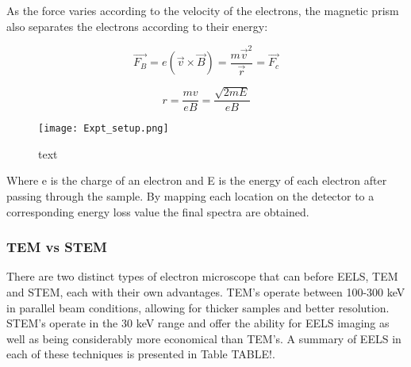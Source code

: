 As the force varies according to the velocity of the electrons, the magnetic prism also separates the electrons according to their energy: 

\begin{equation}
\vec{F_B} = e (\vec{v} \times \vec{B}) =  \frac{m \vec{v}^2}{\vec{r}} = \vec{F_c} 
\end{equation}



\begin{equation} 
r =  \frac{mv}{eB} = \frac{\sqrt{2mE}}{eB}
\end{equation}


\begin{figure}
	\centering
	\texttt{[image: Expt\_setup.png]}
	\caption{text}
	
\end{figure}

Where e is the charge of an electron and E is the energy of each electron after passing through the sample.  By mapping each location on the detector to a corresponding energy loss value the final spectra are obtained.  

\subsubsection{TEM vs STEM}
There are two distinct types of electron microscope that can before EELS, TEM and STEM, each with their own advantages.  TEM's operate between 100-300 keV in parallel beam conditions, allowing for thicker samples and better resolution.  STEM's operate in the 30 keV range and offer the ability for EELS imaging as well as being considerably more economical than TEM's.  A summary of EELS in each of these techniques is presented in Table TABLE!.  

